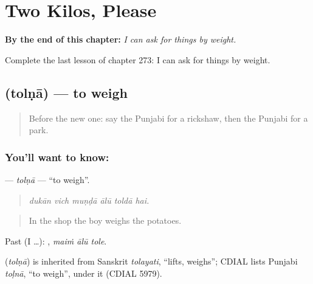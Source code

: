 
\chapter{Two Kilos, Please}
\label{ch:pa-a2-two-kilos-please}

\begin{chapteropening}
\textbf{By the end of this chapter:} \emph{I can ask for things by weight.}

Complete the last lesson of chapter 273: I can ask for things by weight.
\end{chapteropening}

\section[\texorpdfstring{\pa{ਤੋਲਣਾ} (tolṇā)}{ਤੋਲਣਾ (tolṇā)}]{ (tolṇā) — to weigh}

\label{lesson:PA-C273-tolna}



\begin{quote}
Before the new one: say the Punjabi for a rickshaw, then the Punjabi for a park.
\end{quote}

\subsection*{You'll want to know: }
\textbf{} — \emph{tolṇā} — \textquotedblleft{}to weigh\textquotedblright{}.

\begin{quote}
     
\end{quote}

\begin{quote}
\emph{dukān vich muṇḍā ālū toldā hai.}
\end{quote}

\begin{quote}
In the shop the boy weighs the potatoes.
\end{quote}

Past (I …):   , \emph{maiṁ ālū tole}.

\begin{cousinweb}
\textbf{} (\emph{tolṇā}) is inherited from Sanskrit \emph{tolayati}, \textquotedblleft{}lifts, weighs\textquotedblright{}; CDIAL lists Punjabi \emph{toḷnā}, \textquotedblleft{}to weigh\textquotedblright{}, under it (CDIAL 5979).
\end{cousinweb}

